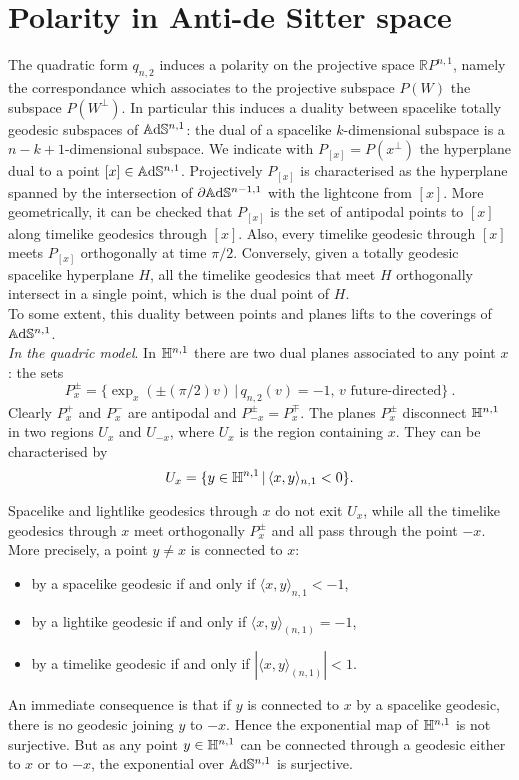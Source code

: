 \section{Polarity in Anti-de Sitter space}
The quadratic form $q_{n,2}$ induces a polarity on the projective space $\mathbb{R}P^{n,1}$, namely the correspondance which associates to the projective subspace $P(W)$ the subspace $P(W^ \perp)$. In particular this induces a duality between spacelike totally geodesic subspaces of $\mathbb{A}\mathrm{d}\mathbb{S}^{n,1}$: the dual of a spacelike $k$-dimensional subspace is a $n-k+1$-dimensional subspace.
We indicate with $P_{[x]}=P(x^\perp)$ the hyperplane dual to a point $[x]\in \mathbb{A}\mathrm{d}\mathbb{S}^{n,1}$.
Projectively $P_{[x]}$ is characterised as the hyperplane spanned by the intersection of $\partial\mathbb{A}\mathrm{d}\mathbb{S}^{n-1,1}$ with the lightcone from $[x]$.
More geometrically, it can be checked that $P_{[x]}$ is the set of antipodal points to $[x]$ along timelike geodesics through $[x]$. Also, every timelike geodesic
through $[x]$ meets $P_{[x]}$ orthogonally at time $\pi/2$. Conversely, given a totally geodesic spacelike hyperplane $H$, all the timelike geodesics that meet $H$ orthogonally  intersect in a single point, which is the dual point of $H$.\\
To some extent, this duality between points and planes lifts to the coverings of $\mathbb{A}\mathrm{d}\mathbb{S}^{n,1}$.\\

\noindent\textit{In the quadric model}. In $\mathbb{H}^{n,1}$ there are two dual planes associated to any point $x$: the sets 
\[
P_{x}^\pm=\{\exp_{x}(\pm(\pi/2)v)\,|\,q_{n,2}(v)=-1,\,v\text{ future-directed}\}~.
\]
Clearly $P_{x}^+$ and $P_{x}^{-} $ are antipodal and  $P_{-x}^\pm=P_{x}^\mp$. The planes $P_x^{\pm}$ disconnect $\mathbb{H}^{n,1}$ in two regions $U_x$ and
$U_{-x}$, where $U_{x}$ is the region containing $x$. They can be characterised by 
\[
U_{x}=\{y\in\mathbb{H}^{n,1}\,|\,\langle x, y\rangle_{n,1}<0\}.
\]

Spacelike and lightlike geodesics through $x$ do not exit $U_{x}$, 
while all the timelike geodesics through $x$ meet orthogonally $P^{\pm}_x$ and all pass through the point $-x$.
More precisely, a point $y\neq x$ is connected to $x$:
\begin{itemize}
\item by a spacelike geodesic if and only if $\langle x,y\rangle_{n,1}<-1$,
\item by a lightike geodesic if and only if $\langle x,y\rangle_{(n,1)}=-1$,
\item by a timelike geodesic if and only if 
$|\langle x,y\rangle_{(n,1)}|<1$.
\end{itemize}
An immediate consequence is that if $y$ is connected to $x$ by a spacelike geodesic, there is no geodesic joining $y$ to $-x$.
Hence the exponential map of $\mathbb{H}^{n,1}$ is not surjective. But as any point $y\in\mathbb{H}^{n,1}$ can be connected through a geodesic either to $x$ or to $-x$,
the exponential over $\mathbb{A}\mathrm{d}\mathbb{S}^{n,1}$ is surjective.\\

